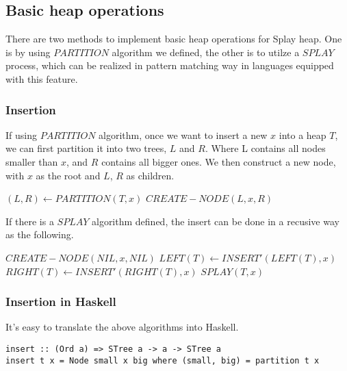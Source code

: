 \documentclass{article}
\begin{document}
\subsection{Basic heap operations}

There are two methods to implement basic heap operations for Splay
heap. One is by using $PARTITION$ algorithm we defined, the other
is to utilze a $SPLAY$ process, which can be realized in pattern matching
way in languages equipped with this feature.

\subsubsection{Insertion}

If using $PARTITION$ algorithm, once we want to insert a new $x$ into
a heap $T$, we can first partition it into two trees, $L$ and $R$. Where
L contains all nodes smaller than $x$, and $R$ contains all bigger ones.
We then construct a new node, with $x$ as the root and $L$, $R$ as children.

\begin{algorithmic}[1]
  \State $(L, R) \gets PARTITION(T, x)$
  \State \Return $CREATE-NODE(L, x, R)$
\EndFunction
\end{algorithmic}

If there is a $SPLAY$ algorithm defined, the insert can be done in a 
recusive way as the following.

\begin{algorithmic}[1]
    \State \Return $CREATE-NODE(NIL, x, NIL)$
  \EndIf
    \State $LEFT(T) \gets INSERT'(LEFT(T), x)$
  \Else
    \State $RIGHT(T) \gets INSERT'(RIGHT(T), x)$
  \EndIf
  \State \Return $SPLAY(T, x)$
\EndFunction
\end{algorithmic}

\subsubsection*{Insertion in Haskell}

It's easy to translate the above algorithms into Haskell.

\lstset{language=Haskell}
\begin{lstlisting}
insert :: (Ord a) => STree a -> a -> STree a
insert t x = Node small x big where (small, big) = partition t x
\end{lstlisting}
\end{document}
